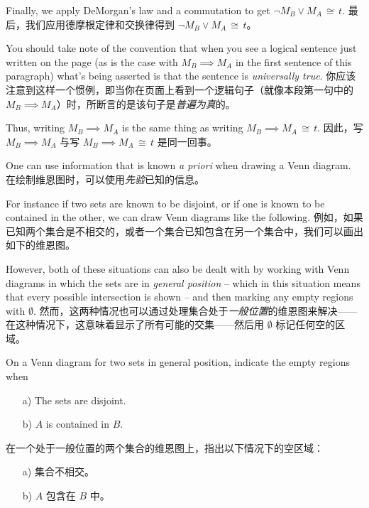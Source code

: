 Finally, we apply DeMorgan's law and a commutation to get 
${\lnot}M_B \lor M_A \, \cong \, t$.
最后，我们应用德摩根定律和交换律得到 ${\lnot}M_B \lor M_A \, \cong \, t$。

You should take note of the 
convention that when you see a logical sentence just written on the 
page (as is the case with $M_B \implies M_A$ in the first sentence
of this paragraph) what's being asserted is that the sentence is 
\emph{universally true}.
你应该注意到这样一个惯例，即当你在页面上看到一个逻辑句子（就像本段第一句中的 $M_B \implies M_A$）时，所断言的是该句子是\emph{普遍为真}的。

Thus, writing $M_B \implies M_A$ is the same thing as writing 
$M_B \implies M_A \, \cong \, t$.
因此，写 $M_B \implies M_A$ 与写 $M_B \implies M_A \, \cong \, t$ 是同一回事。

One can use information that is known \emph{a priori} when 
drawing a Venn diagram.
在绘制维恩图时，可以使用\emph{先验}已知的信息。

For instance if two sets are known 
to be disjoint, or if one is known to be contained in the other,
we can draw Venn diagrams like the following.
例如，如果已知两个集合是不相交的，或者一个集合已知包含在另一个集合中，我们可以画出如下的维恩图。
\vspace{.1in}



\vspace{.2in}



\vspace{.1in}

However, both of these situations can also be dealt with
by working with Venn diagrams in which the sets are in 
 \emph{general position} -- which
in this situation means that every possible intersection is
shown -- and then marking any empty regions with $\emptyset$.
然而，这两种情况也可以通过处理集合处于\emph{一般位置}的维恩图来解决——在这种情况下，这意味着显示了所有可能的交集——然后用 $\emptyset$ 标记任何空的区域。
\begin{exer}
On a Venn diagram for two sets in general position, indicate
the empty regions when
\begin{itemize}
\item[a)] The sets are disjoint.
\item[b)] $A$ is contained in $B$.
\end{itemize}

在一个处于一般位置的两个集合的维恩图上，指出以下情况下的空区域：
\begin{itemize}
\item[a)] 集合不相交。
\item[b)] $A$ 包含在 $B$ 中。
\end{itemize}


\end{exer}

